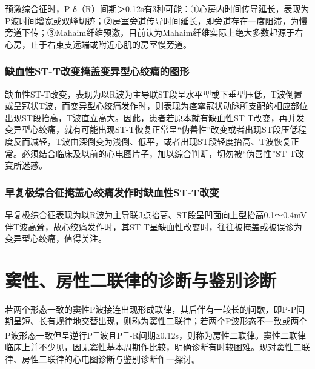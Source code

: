 预激综合征时，P-δ（R）间期＞0.12s有3种可能：①心房内时间传导延长，表现为P波时间增宽或双峰切迹；②房室旁道传导时间延长，即旁道存在一度阻滞，为慢旁道下传；③Mahaim纤维预激，目前认为Mahaim纤维实际上绝大多数起源于右心房，止于右束支远端或附近心肌的房室慢旁道。

\protect\hypertarget{text00043.htmlux5cux23subid480}{}{}

\subsection{缺血性ST-T改变掩盖变异型心绞痛的图形}

缺血性ST-T改变，表现为以R波为主导联ST段呈水平型或下垂型压低，T波倒置或呈冠状T波，而变异型心绞痛发作时，则表现为痉挛冠状动脉所支配的相应部位出现ST段抬高，T波直立高大。因此，患者若原本就有缺血性ST-T改变，再并发变异型心绞痛，就有可能出现ST-T恢复正常呈“伪善性”改变或者出现ST段压低程度反而减轻，T波由深倒变为浅倒、低平，或者出现ST段轻度抬高、T波恢复正常。必须结合临床及以前的心电图片子，加以综合判断，切勿被“伪善性”ST-T改变所迷惑。

\protect\hypertarget{text00043.htmlux5cux23subid481}{}{}

\subsection{早复极综合征掩盖心绞痛发作时缺血性ST-T改变}

早复极综合征表现为以R波为主导联J点抬高、ST段呈凹面向上型抬高0.1～0.4mV伴T波高耸，故心绞痛发作时，其ST-T呈缺血性改变时，往往被掩盖或被误诊为变异型心绞痛，值得关注。

\protect\hypertarget{text00044.html}{}{}

\protect\hypertarget{text00044.htmlux5cux23chapter44}{}{}

\chapter{窦性、房性二联律的诊断与鉴别诊断}

若两个形态一致的窦性P波接连出现形成联律，其后伴有一较长的间歇，即P-P间期呈短、长有规律地交替出现，则称为窦性二联律；若两个P波形态不一致或两个P波形态一致但呈逆行P\textsuperscript{－}波且P\textsuperscript{－}-R间期≥0.12s，则称为房性二联律。窦性二联律临床上并不少见，因无窦性基本周期作比较，明确诊断有时较困难。现对窦性二联律、房性二联律的心电图诊断与鉴别诊断作一探讨。

\protect\hypertarget{text00044.htmlux5cux23subid482}{}{}

